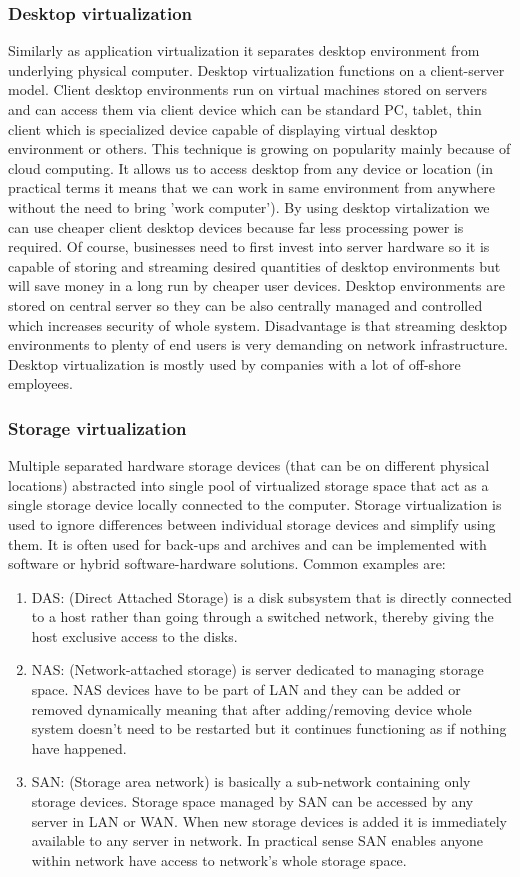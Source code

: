 \subsubsection{Desktop virtualization}
Similarly as application virtualization it separates desktop environment from underlying physical computer. Desktop virtualization functions on a client-server model. Client desktop environments run on virtual machines stored on servers and can access them via client device which can be standard PC, tablet, thin client which is specialized device capable of displaying virtual desktop environment or others. This technique is growing on popularity mainly because of cloud computing. It allows us to access desktop from any device or location (in practical terms it means that we can work in same environment from anywhere without the need to bring 'work computer'). By using desktop virtalization we can use cheaper client desktop devices because far less processing power is required. Of course, businesses need to first invest into server hardware so it is capable of storing and streaming desired quantities of desktop environments but will save money in a long run by cheaper user devices. Desktop environments are stored on central server so they can be also centrally managed and controlled which increases security of whole system. Disadvantage is that streaming desktop environments to plenty of end users is very demanding on network infrastructure. Desktop virtualization is mostly used by companies with a lot of off-shore employees.

\subsubsection{Storage virtualization}
Multiple separated hardware storage devices (that can be on different physical locations) abstracted into single pool of virtualized storage space that act as a single storage device locally connected to the computer. Storage virtualization is used to ignore differences between individual storage devices and simplify using them. It is often used for back-ups and archives and can be implemented with software or hybrid software-hardware solutions. Common examples are:
\begin{enumerate}
\item DAS: (Direct Attached Storage) is a disk subsystem that is directly connected to a host rather than going through a switched network, thereby giving the host exclusive access to the disks. 
\item NAS: (Network-attached storage) is server dedicated to managing storage space. NAS devices have to be part of LAN and they can be added or removed dynamically meaning that after adding/removing device whole system doesn't need to be restarted but it continues functioning as if nothing have happened.
\item SAN: (Storage area network) is basically a sub-network containing only storage devices. Storage space managed by SAN can be accessed by any server in LAN or WAN. When new storage devices is added it is immediately available to any server in network. In practical sense SAN enables anyone within network have access to network's whole storage space.
\end{enumerate}


